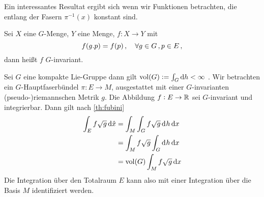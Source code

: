 Ein interessantes Resultat ergibt sich wenn wir Funktionen betrachten, die
entlang der Fasern $\pi^{-1}(x)$ konstant sind.
\begin{definition}
Sei $X$ eine $G$-Menge, $Y$ eine Menge, $f:X\to Y$ mit
\begin{equation}
f(g. p)=f(p)\,,\quad \forall g\in G\,,p\in E\,,
\end{equation}
dann heißt $f$ $G$-invariant.
\end{definition}
Sei $G$ eine kompakte Lie-Gruppe dann gilt $\vol(G):=\int_G\dif h<\infty$
. 
Wir betrachten ein $G$-Hauptfaserbündel $\pi: E\to M$,
ausgestattet mit einer $G$-invarianten {(pseudo-)riemannschen} Metrik $g$. 
Die Abbildung $f:E\to \mathbb{R}$ sei $G$-invariant und integrierbar. Dann gilt nach
\autoref{th:fubini}
\begin{equation}
\begin{split}
\int_E f\sqrt{g}\dif{}\hat{x}&=\int_{M}\int_{G}f\sqrt{g}\dif^{}h \dif x\\
&=\int_{M}f\sqrt{g}\int_{G}\dif^{}h \dif x\\
&=\vol(G)\int_{M}f\sqrt{g} \dif x\\
\end{split}
\end{equation}
Die Integration über den Totalraum $E$ kann also mit einer Integration über die
Basis $M$ identifiziert werden.
